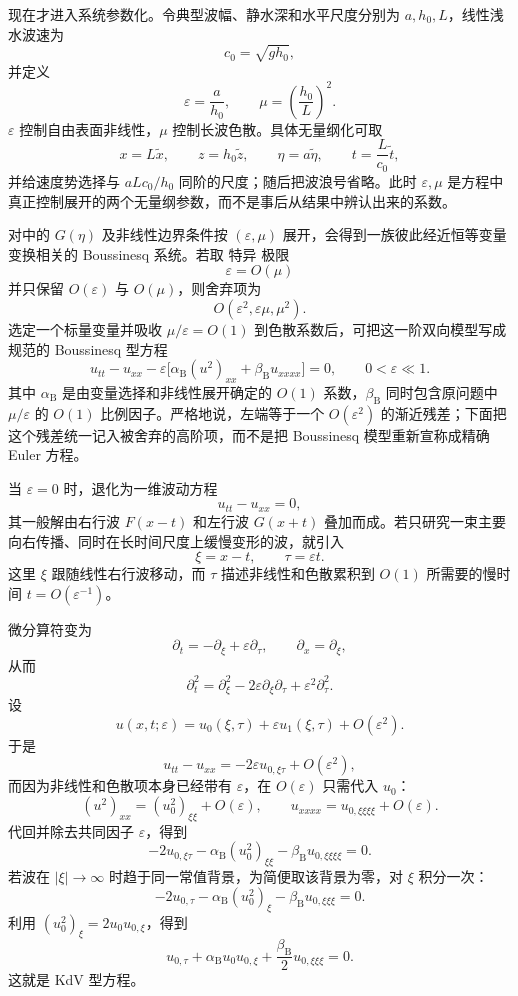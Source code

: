 现在才进入系统参数化。令典型波幅、静水深和水平尺度分别为 $a,h_0,L$，线性浅水波速为
\[
c_0=\sqrt{gh_0},
\]
并定义
\begin{equation*}\boxed{
\varepsilon=\frac{a}{h_0},
\qquad
\mu=\left(\frac{h_0}{L}\right)^2
}.\end{equation*}
$\varepsilon$ 控制自由表面非线性，$\mu$ 控制长波色散。具体无量纲化可取
\[
x=L\tilde x,
\qquad z=h_0\tilde z,
\qquad \eta=a\tilde\eta,
\qquad t=\frac{L}{c_0}\tilde t,
\]
并给速度势选择与 $aLc_0/h_0$ 同阶的尺度；随后把波浪号省略。此时 $\varepsilon,\mu$ 是方程中真正控制展开的两个无量纲参数，而不是事后从结果中辨认出来的系数。

对中的 $G(\eta)$ 及非线性边界条件按 $(\varepsilon,\mu)$ 展开，会得到一族彼此经近恒等变量变换相关的 Boussinesq 系统。若取 特异 极限
\[
\varepsilon=O(\mu)
\]
并只保留 $O(\varepsilon)$ 与 $O(\mu)$，则舍弃项为
\[
O(\varepsilon^2,\varepsilon\mu,\mu^2).
\]
选定一个标量变量并吸收 $\mu/\varepsilon=O(1)$ 到色散系数后，可把这一阶双向模型写成规范的 Boussinesq 型方程
\begin{equation}
\boxed{
u_{tt}-u_{xx}
-\varepsilon\Big[\alpha_{\mathrm B}(u^2)_{xx}+\beta_{\mathrm B}u_{xxxx}\Big]=0,
\qquad 0<\varepsilon\ll1
}.
\label{eq:boussinesq-canonical}
\end{equation}
其中 $\alpha_{\mathrm B}$ 是由变量选择和非线性展开确定的 $O(1)$ 系数，$\beta_{\mathrm B}$ 同时包含原问题中 $\mu/\varepsilon$ 的 $O(1)$ 比例因子。严格地说，左端等于一个 $O(\varepsilon^2)$ 的渐近残差；下面把这个残差统一记入被舍弃的高阶项，而不是把 Boussinesq 模型重新宣称成精确 Euler 方程。

当 $\varepsilon=0$ 时，退化为一维波动方程
\[
u_{tt}-u_{xx}=0,
\]
其一般解由右行波 $F(x-t)$ 和左行波 $G(x+t)$ 叠加而成。若只研究一束主要向右传播、同时在长时间尺度上缓慢变形的波，就引入
\[
\xi=x-t,
\qquad
\tau=\varepsilon t.
\]
这里 $\xi$ 跟随线性右行波移动，而 $\tau$ 描述非线性和色散累积到 $O(1)$ 所需要的慢时间 $t=O(\varepsilon^{-1})$。

微分算符变为
\[
\partial_t=-\partial_\xi+\varepsilon\partial_\tau,
\qquad
\partial_x=\partial_\xi,
\]
从而
\[
\partial_t^2
=\partial_\xi^2-2\varepsilon\partial_\xi\partial_\tau
+\varepsilon^2\partial_\tau^2.
\]
设
\[
u(x,t;\varepsilon)=u_0(\xi,\tau)+\varepsilon u_1(\xi,\tau)+O(\varepsilon^2).
\]
于是
\[
u_{tt}-u_{xx}=-2\varepsilon u_{0,\xi\tau}+O(\varepsilon^2),
\]
而因为非线性和色散项本身已经带有 $\varepsilon$，在 $O(\varepsilon)$ 只需代入 $u_0$：
\[
(u^2)_{xx}=(u_0^2)_{\xi\xi}+O(\varepsilon),
\qquad
u_{xxxx}=u_{0,\xi\xi\xi\xi}+O(\varepsilon).
\]
代回并除去共同因子 $\varepsilon$，得到
\[
-2u_{0,\xi\tau}-\alpha_{\mathrm B}(u_0^2)_{\xi\xi}
-\beta_{\mathrm B}u_{0,\xi\xi\xi\xi}=0.
\]
若波在 $|\xi|\to\infty$ 时趋于同一常值背景，为简便取该背景为零，对 $\xi$ 积分一次：
\[
-2u_{0,\tau}-\alpha_{\mathrm B}(u_0^2)_\xi
-\beta_{\mathrm B}u_{0,\xi\xi\xi}=0.
\]
利用 $(u_0^2)_\xi=2u_0u_{0,\xi}$，得到
\begin{equation}
\boxed{
u_{0,\tau}+\alpha_{\mathrm B}u_0u_{0,\xi}
+\frac{\beta_{\mathrm B}}{2}u_{0,\xi\xi\xi}=0
}.
\label{eq:boussinesq-to-kdv}
\end{equation}
这就是 KdV 型方程。

